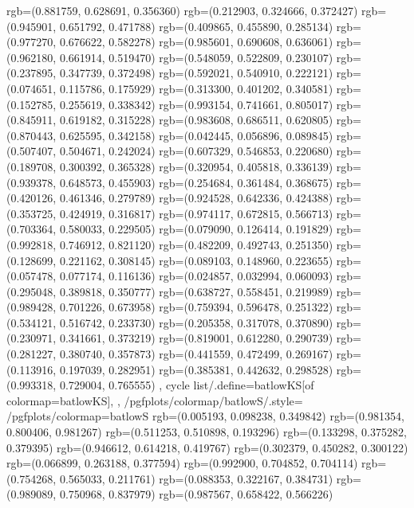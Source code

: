 {{{					rgb=(0.881759, 0.628691, 0.356360)
					rgb=(0.212903, 0.324666, 0.372427)
					rgb=(0.945901, 0.651792, 0.471788)
					rgb=(0.409865, 0.455890, 0.285134)
					rgb=(0.977270, 0.676622, 0.582278)
					rgb=(0.985601, 0.690608, 0.636061)
					rgb=(0.962180, 0.661914, 0.519470)
					rgb=(0.548059, 0.522809, 0.230107)
					rgb=(0.237895, 0.347739, 0.372498)
					rgb=(0.592021, 0.540910, 0.222121)
					rgb=(0.074651, 0.115786, 0.175929)
					rgb=(0.313300, 0.401202, 0.340581)
					rgb=(0.152785, 0.255619, 0.338342)
					rgb=(0.993154, 0.741661, 0.805017)
					rgb=(0.845911, 0.619182, 0.315228)
					rgb=(0.983608, 0.686511, 0.620805)
					rgb=(0.870443, 0.625595, 0.342158)
					rgb=(0.042445, 0.056896, 0.089845)
					rgb=(0.507407, 0.504671, 0.242024)
					rgb=(0.607329, 0.546853, 0.220680)
					rgb=(0.189708, 0.300392, 0.365328)
					rgb=(0.320954, 0.405818, 0.336139)
					rgb=(0.939378, 0.648573, 0.455903)
					rgb=(0.254684, 0.361484, 0.368675)
					rgb=(0.420126, 0.461346, 0.279789)
					rgb=(0.924528, 0.642336, 0.424388)
					rgb=(0.353725, 0.424919, 0.316817)
					rgb=(0.974117, 0.672815, 0.566713)
					rgb=(0.703364, 0.580033, 0.229505)
					rgb=(0.079090, 0.126414, 0.191829)
					rgb=(0.992818, 0.746912, 0.821120)
					rgb=(0.482209, 0.492743, 0.251350)
					rgb=(0.128699, 0.221162, 0.308145)
					rgb=(0.089103, 0.148960, 0.223655)
					rgb=(0.057478, 0.077174, 0.116136)
					rgb=(0.024857, 0.032994, 0.060093)
					rgb=(0.295048, 0.389818, 0.350777)
					rgb=(0.638727, 0.558451, 0.219989)
					rgb=(0.989428, 0.701226, 0.673958)
					rgb=(0.759394, 0.596478, 0.251322)
					rgb=(0.534121, 0.516742, 0.233730)
					rgb=(0.205358, 0.317078, 0.370890)
					rgb=(0.230971, 0.341661, 0.373219)
					rgb=(0.819001, 0.612280, 0.290739)
					rgb=(0.281227, 0.380740, 0.357873)
					rgb=(0.441559, 0.472499, 0.269167)
					rgb=(0.113916, 0.197039, 0.282951)
					rgb=(0.385381, 0.442632, 0.298528)
					rgb=(0.993318, 0.729004, 0.765555)
			},
		cycle list/.define={batlowKS}{[of colormap=batlowKS]},
		},
		/pgfplots/colormap/batlowS/.style={
			/pgfplots/colormap={batlowS}{%
					rgb=(0.005193, 0.098238, 0.349842)
					rgb=(0.981354, 0.800406, 0.981267)
					rgb=(0.511253, 0.510898, 0.193296)
					rgb=(0.133298, 0.375282, 0.379395)
					rgb=(0.946612, 0.614218, 0.419767)
					rgb=(0.302379, 0.450282, 0.300122)
					rgb=(0.066899, 0.263188, 0.377594)
					rgb=(0.992900, 0.704852, 0.704114)
					rgb=(0.754268, 0.565033, 0.211761)
					rgb=(0.088353, 0.322167, 0.384731)
					rgb=(0.989089, 0.750968, 0.837979)
					rgb=(0.987567, 0.658422, 0.566226)
}}}
